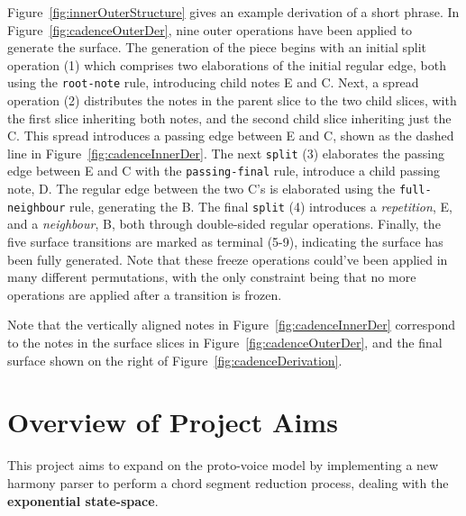 \documentclass[12pt,a4paper,twoside,openany]{report} \usepackage[pdfborder={0 0 0}]{hyperref}    %
\theoremstyle{definition} \newtheorem{definition}{Definition}[section]
\begin{document}
Figure~\ref{fig:innerOuterStructure} gives an example derivation of a short phrase. 
In Figure~\ref{fig:cadenceOuterDer}, nine outer operations have been applied to generate the surface.
The generation of the piece begins with an initial split operation (1) which comprises two elaborations of the initial
regular edge, both using the \texttt{root-note} rule, introducing child notes E and C. 
Next, a spread operation (2) distributes the notes in the parent slice to the two child slices, with the first slice inheriting both notes, and the second child slice inheriting just the C. 
This spread introduces a passing edge between E and C, shown as the dashed line in Figure~\ref{fig:cadenceInnerDer}. 
The next \texttt{split} (3) elaborates the passing edge between E and
C with the \texttt{passing-final} rule,
introduce a child passing note, D. The regular edge between the two C's is elaborated using the
\texttt{full-neighbour} rule, generating the B. The final \texttt{split} (4) introduces a \textit{repetition}, E, and
a \textit{neighbour}, B, both through double-sided regular operations. Finally, the five surface transitions are marked
as terminal (5-9), indicating the surface has been fully generated. Note that these freeze operations could've been
applied in many different permutations, with the only constraint being that no more operations are applied after a transition is frozen.

Note that the vertically aligned notes in Figure~\ref{fig:cadenceInnerDer}
correspond to the notes in the surface slices in Figure~\ref{fig:cadenceOuterDer}, and the final surface shown on the
right of Figure~\ref{fig:cadenceDerivation}. 


\section{Overview of Project Aims} %
\label{sec:protoVoiceParser}
This project aims to expand on the proto-voice model by implementing a new harmony parser to perform a chord segment
reduction process, dealing with the \textbf{exponential state-space}.
\end{document}
